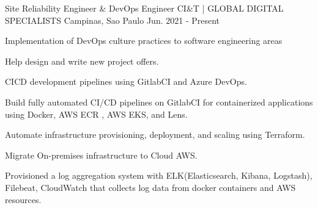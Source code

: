 

\begin{cventries}

  \cventry
    {Site Reliability Engineer \& DevOps Engineer} %
    {CI\&T | GLOBAL DIGITAL SPECIALISTS} %
    {Campinas, Sao Paulo} %
    {Jun. 2021 - Present} %
    {
      \begin{cvitems} %
        \item {Implementation of DevOps culture practices to software engineering areas}
        \item {Help design and write new project offers.}
        \item {CICD development pipelines using GitlabCI and Azure DevOps.}
        \item {Build fully automated CI/CD pipelines on GitlabCI for containerized applications using Docker, AWS ECR , AWS EKS, and Lens.}
        \item {Automate infrastructure provisioning, deployment, and scaling using Terraform.}
        \item {Migrate On-premises infrastructure to Cloud AWS.}
        \item {Provisioned a log aggregation system with ELK(Elasticsearch, Kibana, Logstash), Filebeat, CloudWatch that collects log data from docker containers and AWS resources.}
      \end{cvitems}
    }
\break


\end{cventries}
